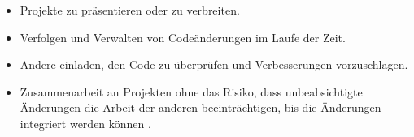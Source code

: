 \begin{itemize}
	\item Projekte zu präsentieren oder zu verbreiten.
	\item Verfolgen und Verwalten von Codeänderungen im Laufe der Zeit.
	\item Andere einladen, den Code zu überprüfen und Verbesserungen vorzuschlagen.
	\item Zusammenarbeit an Projekten ohne das Risiko, dass unbeabsichtigte Änderungen die Arbeit der anderen beeinträchtigen, bis die Änderungen integriert werden können  \cite{github:o.J}.
\end{itemize} 














